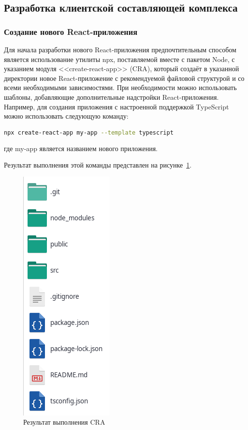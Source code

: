 \subsection{Разработка клиентской составляющей комплекса}

\subsubsection{Создание нового React-приложения}

Для начала разработки нового React-приложения предпочтительным способом является использование утилиты npx, поставляемой вместе с пакетом Node, с указанием модуля <<create-react-app>> (CRA), который создаёт в указанной директории новое React-приложение с рекомендуемой файловой структурой и со всеми необходимыми зависимостями. При необходимости можно использовать шаблоны, добавляющие дополнительные надстройки React-прило\-жения. Например, для создания приложения с настроенной поддержкой TypeScript можно использовать следующую команду:

\begin{lstlisting}[style=ES6, language=bash]
  npx create-react-app my-app --template typescript
\end{lstlisting}

где my-app является названием нового приложения.

Результат выполнения этой команды представлен на рисунке~\ref{img:cre__init}.

\begin{figure}[H]
  \centering
  \includegraphics[height=0.3\textheight]{assets/images/practical/cra__init.png}
  \caption{Результат выполнения CRA}
  \label{img:cre__init}
\end{figure}

